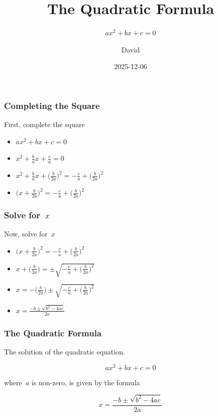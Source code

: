 \documentclass{ltx-talk}
\title{The Quadratic Formula}
\subtitle{$ax^{2} + bx + c = 0$}
\author{David}
\institute{The \LaTeX{} Project}
\date{2025-12-06}
\begin{document}
\maketitle


\begin{frame}
  \frametitle{Completing the Square}

  \large

  First, complete the square
  
  \begin{itemize}[action-spec = <+->, item-vspace = 20pt, begin-vspace = 20pt]
    \item $ax^{2} + bx +c=0$
    \item $x^{2} + \frac{b}{a}x + \frac{c}{a} = 0$
    \item $x^{2} + \frac{b}{a}x + \bigl(\frac{b}{2a}\bigr)^{2} 
      = -\frac{c}{a} + \bigl(\frac{b}{2a}\bigr)^{2}$
    \item $\bigl(x + \frac{b}{2a}\bigr)^{2} 
      = -\frac{c}{a} + \bigl(\frac{b}{2a}\bigr)^{2}$
  \end{itemize}
\end{frame}

\begin{frame}
 \frametitle{Solve for~$x$}
 \large

 Now, solve for~$x$
 
  \begin{itemize}[action-spec = <+->, item-vspace = 20pt, begin-vspace = 20pt]
    \item $\bigl(x + \frac{b}{2a}\bigr)^{2}
      = -\frac{c}{a} + \bigl(\frac{b}{2a}\bigr)^{2}$
    \item $x + \bigl(\frac{b}{2a}\bigr)
      = \pm \sqrt{-\frac{c}{a} + \bigl(\frac{b}{2a}\bigr)^{2}}$
    \item $x = -\bigl(\frac{b}{2a}\bigr)
      \pm \sqrt{-\frac{c}{a} + \bigl(\frac{b}{2a}\bigr)^{2}}$
    \item $\displaystyle x = \frac{-b \pm \sqrt{b^{2} - 4ac}}{2a}$
  \end{itemize}
    
\end{frame}

\begin{frame}
 \frametitle{The Quadratic Formula}
 \large

 The solution of the quadratic equation.

 \[
   ax^{2} + bx + c = 0
 \]

 where~$a$ is non-zero, is given by the formula

  \[
    x = \frac{-b \pm \sqrt{b^{2} - 4ac}}{2a}
  \]

\end{frame}
\end{document}
